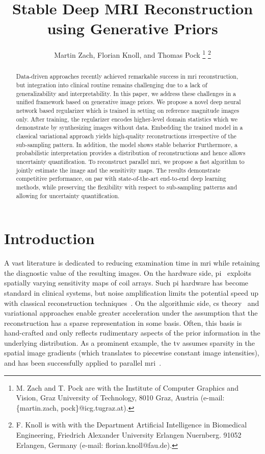 \documentclass[twocolumn]{article}
\title{Stable Deep MRI Reconstruction\\using Generative Priors}
\author{%
	Martin Zach, %
	Florian Knoll, and %
	Thomas Pock%
	\thanks{
		M. Zach and T. Pock are with the Institute of Computer Graphics and Vision, Graz University of Technology, 8010 Graz, Austria (e-mail: \{martin.zach, pock\}@icg.tugraz.at).
	}%
	\thanks{%
		F. Knoll is with with the Department Artificial Intelligence in Biomedical Engineering, Friedrich Alexander University Erlangen Nuernberg. 91052 Erlangen, Germany (e-mail: florian.knoll@fau.de).
	}
}
\begin{document}
\maketitle
\begin{abstract}
	Data-driven approaches recently achieved remarkable success in \gls{mri} reconstruction, but integration into clinical routine remains challenging due to a lack of generalizability and interpretability.
	In this paper, we address these challenges in a unified framework based on generative image priors.
	We propose a novel deep neural network based regularizer which is trained in  setting on reference magnitude images only.
	After training, the regularizer encodes higher-level domain statistics which we demonstrate by synthesizing images without data.
	Embedding the trained model in a classical variational approach yields high-quality reconstructions irrespective of the sub-sampling pattern.
	In addition, the model shows stable behavior 
	Furthermore, a probabilistic interpretation provides a distribution of reconstructions and hence allows uncertainty quantification.
	To reconstruct parallel \gls{mri}, we propose a fast algorithm to jointly estimate the image and the sensitivity maps.
	The results demonstrate competitive performance, on par with state-of-the-art end-to-end deep learning methods, while preserving the flexibility with respect to sub-sampling patterns and allowing for uncertainty quantification.
\end{abstract}

\glsresetall{}
\section{Introduction}
A vast literature is dedicated to reducing examination time in \gls{mri} while retaining the diagnostic value of the resulting images.
On the hardware side, \gls{pi}~\cite{pruessmann} exploits spatially varying sensitivity maps of coil arrays.
Such \gls{pi} hardware has become standard in clinical systems, but noise amplification limits the potential speed up with classical reconstruction techniques~\cite{Robson2008}.
On the algorithmic side, \gls{cs} theory~\cite{donoho_compressed_2006} and variational approaches enable greater acceleration under the assumption that the reconstruction has a sparse representation in some basis.
Often, this basis is hand-crafted and only reflects rudimentary aspects of the prior information in the underlying distribution.
As a prominent example, the \gls{tv} assumes sparsity in the spatial image gradients (which translates to piecewise constant image intensities), and has been successfully applied to parallel \gls{mri}~\cite{Knoll2011}.
\end{document}
